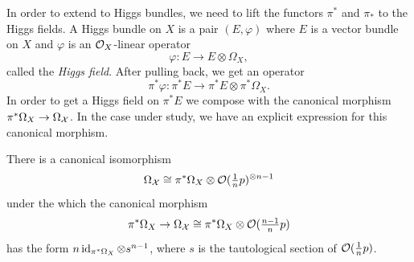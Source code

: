 \documentclass{article}
\begin{document}

In order to extend  to Higgs bundles, we need to lift the functors $\pi^*$ and $\pi_*$ to the Higgs fields. A Higgs bundle on $X$ is a pair $(E, \varphi)$ where $E$ is a vector bundle on $X$ and $\varphi$ is an $\mathcal{O}_X$-linear operator
\begin{equation}
\varphi\colon E \to E \otimes \Omega_X,
\end{equation}
called the \textit{Higgs field}.
After pulling back, we get an operator
\begin{equation}
\pi^* \varphi\colon \pi^* E \to \pi^* E \otimes \pi^* \Omega_X.
\end{equation}
In order to get a Higgs field on $\pi^* E$ we compose with the canonical morphism $\pi^* \Omega_X \to \Omega_{\mathcal{X}}$. In the case under study, we have an explicit expression for this canonical morphism.
\begin{lemma}
There is a canonical isomorphism
\[
\Omega_{\mathcal{X}} \cong \pi^* \Omega_X \otimes \mathcal{O}(\tfrac{1}{n}p)^{\otimes n -1}
\]
under the which the canonical morphism
\begin{equation} \label{eq: canonical morphism cotangent}
\pi^* \Omega_X \to \Omega_{\mathcal{X}} \cong \pi^*\Omega_X \otimes \mathcal{O}(\tfrac{n-1}{n}p)
\end{equation}
has the form $n \operatorname{id}_{\pi^* \Omega_X} \otimes s^{n-1}$, where $s$ is the tautological section of $\mathcal{O}(\tfrac{1}{n}p)$.
\end{lemma}
\end{document}
